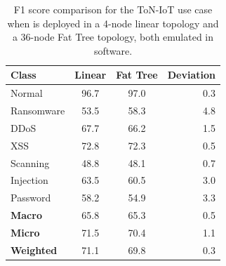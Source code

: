 \begin{table}
\centering
\caption{F1 score comparison for the ToN-IoT use case when \name is deployed in a 4-node linear topology and a 36-node Fat Tree topology, both emulated in software.}
\label{tab:f1_comparison}
\begin{tabular}{lccr}
\toprule
Class & Linear & Fat Tree & Deviation \\%
\midrule
Normal & 96.7 & 97.0 & 0.3 \\ %
Ransomware & 53.5 & 58.3 & 4.8 \\ %
DDoS & 67.7 & 66.2 & 1.5 \\ %
XSS & 72.8 & 72.3 & 0.5 \\ %
Scanning & 48.8 & 48.1 & 0.7 \\ %
Injection & 63.5 & 60.5 & 3.0 \\ %
Password & 58.2 & 54.9 & 3.3 \\ %
\midrule
\textbf{Macro} & 65.8 & 65.3 & 0.5 \\ %
\textbf{Micro} & 71.5 & 70.4 & 1.1 \\ %
\textbf{Weighted} & 71.1 & 69.8 & 0.3 \\ %
\bottomrule
\end{tabular}
\end{table}